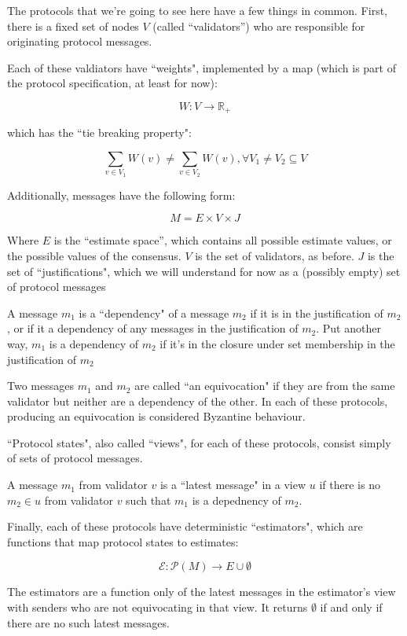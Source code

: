 \documentclass{article}
\theoremstyle{definition}
\begin{document}
The protocols that we're going to see here have a few things in common. First, there is a fixed set of nodes $V$ (called ``validators'') who are responsible for originating protocol messages. 

Each of these valdiators have ``weights", implemented by a map (which is part of the protocol specification, at least for now):

$$
W: V \to \mathbb{R}_+
$$

which has the ``tie breaking property":

$$
\sum_{v \in V_1} W(v) \neq \sum_{v \in V_2} W(v), \forall V_1 \neq V_2 \subseteq V
$$

Additionally, messages have the following form:

$$
M = E \times V \times J
$$

Where $E$ is the ``estimate space'', which contains all possible estimate values, or the possible values of the consensus. $V$ is the set of validators, as before. $J$ is the set of ``justifications", which we will understand for now as a (possibly empty) set of protocol messages

A message $m_1$ is a ``dependency" of a message $m_2$ if it is in the justification of $m_2$, or if it a dependency of any messages in the justification of $m_2$. Put another way, $m_1$ is a dependency of $m_2$ if it's in the closure under set membership in the justification of $m_2$

Two messages $m_1$ and $m_2$ are called ``an equivocation" if they are from the same validator but neither are a dependency of the other. In each of these protocols, producing an equivocation is considered Byzantine behaviour.

``Protocol states", also called ``views", for each of these protocols, consist simply of sets of protocol messages. 

A message $m_1$ from validator $v$ is a ``latest message" in a view $u$ if there is no $m_2 \in u$ from validator $v$ such that $m_1$ is a depednency of $m_2$.

Finally, each of these protocols have deterministic ``estimators", which are functions that map protocol states to estimates:

$$
\mathcal{E}: \mathcal{P}(M) \to E\cup\emptyset
$$

The estimators are a function only of the latest messages in the estimator's view with senders who are not equivocating in that view. It returns $\emptyset$ if and only if there are no such latest messages.
\end{document}

